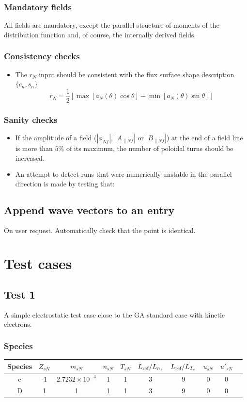 \documentclass[fleqn]{report}
\begin{document}
\subsection{Mandatory fields}
All fields are mandatory, except the parallel structure of moments of the distribution function and, of course, the internally derived fields. 


\subsection{Consistency checks}
\begin{itemize}
\item The $r_N$ input should be consistent with the flux surface shape description $\{c_n,s_n\}$
$$r_N = \frac{1}{2}\left[\max[a_N(\theta)\cos\theta]-\min[a_N(\theta)\sin\theta]\right]$$

\end{itemize}

\subsection{Sanity checks}
\begin{itemize}
\item If the amplitude of a field ($|\phi_{Nf}|$, $|A_{\parallel Nf}|$ or $|B_{\parallel Nf}|$) at the end of a field line is more than $5\%$ of its maximum, the number of poloidal turns should be increased.
\item An attempt to detect runs that were numerically unstable in the parallel direction is made by testing that: 
\end{itemize}

\section{Append wave vectors to an entry}
On user request. Automatically check that the point is identical.

\chapter{Test cases}

\section{Test 1}
A simple electrostatic test case close to the GA standard case with kinetic electrons.
\subsection{Species}
\begin{tabular}{c c c c c c c c c c}
\hline
Species & $Z_{sN}$ & $m_{sN}$ & $n_{sN}$ & $T_{sN}$ & $L_{\textrm{ref}}/L_{n_s}$ & $L_{\textrm{ref}}/L_{T_s}$ & $u_{sN}$ & $u'_{sN}$ \\ [0.5ex]
\hline
e & -1 & $2.7232\times10^{-4}$ & 1 & 1 & 3 & 9 & 0 & 0 \\ [0.5ex]
\hline 
D &  1 & 1 & 1 & 1 & 3 & 9 & 0 & 0 \\ [0.5ex]
\hline
\end{tabular}
\end{document}
